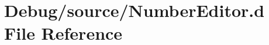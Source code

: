 \hypertarget{_number_editor_8d}{}\section{Debug/source/\+Number\+Editor.d File Reference}
\label{_number_editor_8d}
